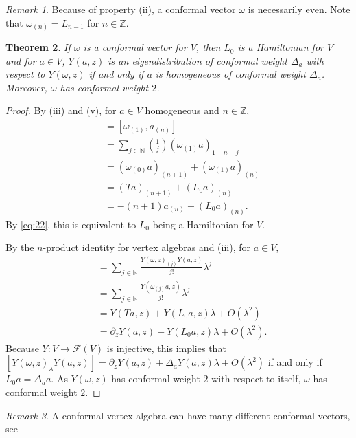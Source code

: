 \documentclass[a4paper, 12pt, reqno]{amsart}
\newtheorem{theorem}{Theorem}[subsection]
\theoremstyle{remark}
\newtheorem{remark}[theorem]{Remark}
\numberwithin{equation}{subsection}
\begin{document}
\begin{remark}
  \label{rmk:15}
  Because of property (ii), a conformal vector $\omega$ is necessarily even.
  Note that $\omega_{(n)} = L_{n - 1}$ for $n \in \mathbb{Z}$.
\end{remark}

\begin{theorem}
  \label{thr:18}
  If $\omega$ is a conformal vector for $V$, then $L_0$ is a Hamiltonian for $V$ and for $a \in V$, $Y(a, z)$ is an eigendistribution of conformal weight $\Delta_a$ with respect to $Y(\omega, z)$ if and only if $a$ is homogeneous of conformal weight $\Delta_a$.
  Moreover, $\omega$ has conformal weight $2$.
\end{theorem}

\begin{proof}
  By (iii) and (v), for $a \in V$ homogeneous and $n \in \mathbb{Z}$,
  \begin{align*}
    [L_0, a_{(n)}] &= [\omega_{(1)}, a_{(n)}] \\
    &= \sum_{j \in \mathbb{N}}\binom{1}{j}(\omega_{(1)}a)_{1 + n - j} \\
    &= (\omega_{(0)}a)_{( n + 1)} + (\omega_{(1)}a)_{(n)} \\
    &= (Ta)_{(n + 1)} + (L_0a)_{(n)} \\
    &= -(n + 1)a_{(n)} + (L_0a)_{(n)}.
  \end{align*}
  By \eqref{eq:22}, this is equivalent to $L_0$ being a Hamiltonian for $V$.

  By the $n$-product identity for vertex algebras and (iii), for $a \in V$,
  \begin{align*}
    [Y(\omega, z)_{\lambda}Y(a, z)] &= \sum_{j \in \mathbb{N}}\frac{Y(\omega, z)_{(j)}Y(a, z)}{j!}\lambda^j \\
    &= \sum_{j \in \mathbb{N}}\frac{Y(\omega_{(j)}a, z)}{j!}\lambda^j \\
    &= Y(Ta, z) + Y(L_0a, z)\lambda + O(\lambda^2) \\
    &= \partial_zY(a, z) + Y(L_0a, z)\lambda + O(\lambda^2).
  \end{align*}
  Because $Y: V \to \mathcal{F}(V)$ is injective, this implies that $[Y(\omega, z)_{\lambda}Y(a, z)] = \partial_zY(a, z) + \Delta_aY(a, z)\lambda + O(\lambda^2)$ if and only if $L_0a = \Delta_aa$.
  As $Y(\omega, z)$ has conformal weight $2$ with respect to itself, $\omega$ has conformal weight $2$.
\end{proof}

\begin{remark}
  \label{rmk:16}
  A conformal vertex algebra can have many different conformal vectors, see \cite[2.5.9. Examples.]{frenkel_vertex_2001}
\end{remark}
\end{document}
